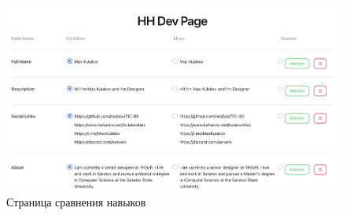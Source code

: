 \documentclass[master, och, pract]{SCWorks}
\begin{document}
\begin{figure}[!ht]
    \centering
    \includegraphics[width=12cm]{images/image-compare-skills.png}
    \caption{\label{fig:5}%
        Страница сравнения навыков}
\end{figure}
\end{document}
